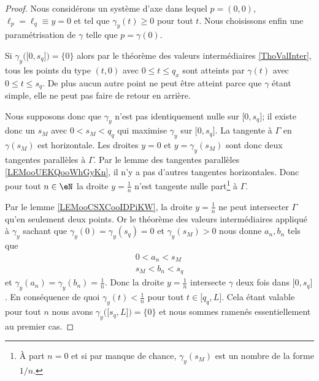 \begin{proof}
    Nous considérons un système d'axe dans lequel \( p=(0,0)\), \( \ell_p=\ell_q\equiv y=0\) et tel que \( \gamma_y(t)\geq 0\) pour tout \( t\). Nous choisissons enfin une paramétrisation de \( \gamma\) telle que \( p=\gamma(0)\).

    Si \( \gamma_y\big( \mathopen[ 0 , s_q \mathclose] \big)=\{ 0 \}\) alors par le théorème des valeurs intermédiaires \ref{ThoValInter}, tous les points du type \( (t,0)\) avec \( 0\leq t\leq q_x\) sont atteints par \(  \gamma(t)   \) avec \( 0\leq t\leq s_q\). De plus aucun autre point ne peut être atteint parce que \( \gamma\) étant simple, elle ne peut pas faire de retour en arrière.

    Nous supposons donc que \( \gamma_y\) n'est pas identiquement nulle sur \( \mathopen[ 0 , s_q \mathclose]\); il existe donc un \( s_M\) avec  \( 0<s_M<q_q\) qui maximise \( \gamma_y\) sur \( \mathopen[ 0 , s_q \mathclose]\). La tangente à \( \Gamma\) en \( \gamma(s_M)\) est horizontale. Les droites \( y=0\) et \( y=\gamma_y(s_M)\) sont donc deux tangentes parallèles à \( \Gamma\). Par le lemme des tangentes parallèles \ref{LEMooUEKQooWhGyKn}, il n'y a pas d'autres tangentes horizontales. Donc pour tout \( n\in \eN\) la droite \( y=\frac{1}{ n }\) n'est tangente nulle part\footnote{À part \( n=0\) et si par manque de chance, \( \gamma_y(s_M) \) est un nombre de la forme \( 1/n\).} à \( \Gamma\).

    Par le lemme \ref{LEMooCSXCooIDPiKW}, la droite \( y=\frac{1}{ n }\) ne peut intersecter \( \Gamma\) qu'en seulement deux points. Or le théorème des valeurs intermédiaires appliqué à \( \gamma_y\) sachant que \( \gamma_y(0)=\gamma_y(s_q)=0\) et \( \gamma_y(s_M)>0\) nous donne \( a_n,b_n\) tels que
    \begin{subequations}
        \begin{align}
            0<a_n<s_M\\
            s_M<b_n<s_q
        \end{align}
    \end{subequations}
    et \( \gamma_y(a_n)=\gamma_y(b_n)=\frac{1}{ n }\). Donc la droite \( y=\frac{1}{ n }\) intersecte \( \gamma\) deux fois dans \( \mathopen[ 0 , s_q \mathclose]\). En conséquence de quoi \( \gamma_y(t)<\frac{1}{ n }\) pour tout \( t\in\mathopen[ q_q , L \mathclose]\). Cela étant valable pour tout \( n\) nous avons \( \gamma_y\big( \mathopen[ s_q , L \mathclose] \big)=\{ 0 \}\) et nous sommes ramenés essentiellement au premier cas.
\end{proof}

